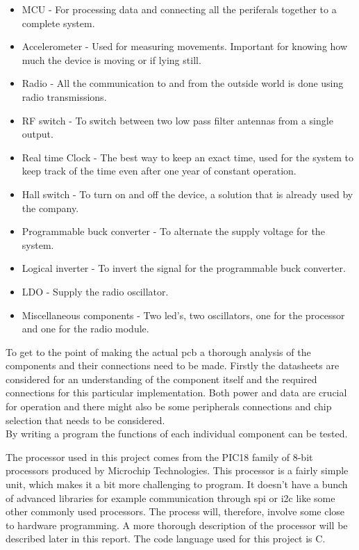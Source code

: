 \begin{itemize}[noitemsep]
	\item MCU - For processing data and connecting all the periferals together to a complete system.
	\item Accelerometer - Used for measuring movements. Important for knowing how much the device is moving or if lying still.
	\item Radio - All the communication to and from the outside world is done using radio transmissions. 
	\item RF switch - To switch between two low pass filter antennas from a single output.
	\item Real time Clock - The best way to keep an exact time, used for the system to keep track of the time even after one year of constant operation. 
	\item Hall switch - To turn on and off the device, a solution that is already used by the company.
	\item Programmable buck converter - To alternate the supply voltage for the system. 
	\item Logical inverter - To invert the signal for the programmable buck converter.
	\item LDO - Supply the radio oscillator.
	\item Miscellaneous components - Two \gls{led}'s, two oscillators, one for the processor and one for the radio module.
\end{itemize}


To get to the point of making the actual \gls{pcb} a thorough analysis of the components and their connections need to be made. Firstly the datasheets are considered for an understanding of the component itself and the required connections for this particular implementation. Both power and data are crucial for operation and there might also be some peripherals connections and chip selection that needs to be considered. \\
By writing a program the functions of each individual component can be tested. 

The processor used in this project comes from the PIC18 family of 8-bit processors produced by Microchip Technologies. This processor is a fairly simple unit, which makes it a bit more challenging to program. It doesn't have a bunch of advanced libraries for example communication through \gls{spi} or \gls{i2c} like some other commonly used processors. The process will, therefore, involve some close to hardware programming. A more thorough description of the processor will be described later in this report. The code language used for this project is C.

